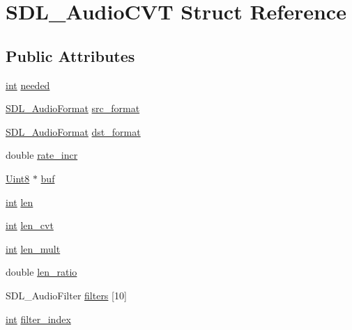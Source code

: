 \hypertarget{structSDL__AudioCVT}{}\section{S\+D\+L\+\_\+\+Audio\+C\+V\+T Struct Reference}
\label{structSDL__AudioCVT}
\subsection*{Public Attributes}
\begin{DoxyCompactItemize}
\item 
\hyperlink{SDL__thread_8h_a6a64f9be4433e4de6e2f2f548cf3c08e}{int} \hyperlink{structSDL__AudioCVT_ac600a035a48df05e14d3712fd6953ad4}{needed}
\item 
\hyperlink{SDL__audio_8h_a491ed103fd25d920c4e6b7495217ce66}{S\+D\+L\+\_\+\+Audio\+Format} \hyperlink{structSDL__AudioCVT_a6ae81231e017105e6d5e745a51732e16}{src\+\_\+format}
\item 
\hyperlink{SDL__audio_8h_a491ed103fd25d920c4e6b7495217ce66}{S\+D\+L\+\_\+\+Audio\+Format} \hyperlink{structSDL__AudioCVT_a8f890d017be857a3b048bf00525736c6}{dst\+\_\+format}
\item 
double \hyperlink{structSDL__AudioCVT_ad886122c23a6673073baace31bff3b6c}{rate\+\_\+incr}
\item 
\hyperlink{SDL__stdinc_8h_a2944638813a090aa23e62f4da842c3e2}{Uint8} $\ast$ \hyperlink{structSDL__AudioCVT_a080db27b929efa983c5161360ffce310}{buf}
\item 
\hyperlink{SDL__thread_8h_a6a64f9be4433e4de6e2f2f548cf3c08e}{int} \hyperlink{structSDL__AudioCVT_aeaeb8c5a63c3ab96471fbfdf412c78ff}{len}
\item 
\hyperlink{SDL__thread_8h_a6a64f9be4433e4de6e2f2f548cf3c08e}{int} \hyperlink{structSDL__AudioCVT_a5c60163f34d1947e5b166c23aba9879d}{len\+\_\+cvt}
\item 
\hyperlink{SDL__thread_8h_a6a64f9be4433e4de6e2f2f548cf3c08e}{int} \hyperlink{structSDL__AudioCVT_ac9662d47cf2348b82b27b151150116b0}{len\+\_\+mult}
\item 
double \hyperlink{structSDL__AudioCVT_a5628ff5ccf711de9d77c0a4a9f57d2f0}{len\+\_\+ratio}
\item 
S\+D\+L\+\_\+\+Audio\+Filter \hyperlink{structSDL__AudioCVT_aeec0ebddc5e142bbafcc94a6014ad23e}{filters} \mbox{[}10\mbox{]}
\item 
\hyperlink{SDL__thread_8h_a6a64f9be4433e4de6e2f2f548cf3c08e}{int} \hyperlink{structSDL__AudioCVT_a35093b3ad3331c17416c593a76012b63}{filter\+\_\+index}
\end{DoxyCompactItemize}


